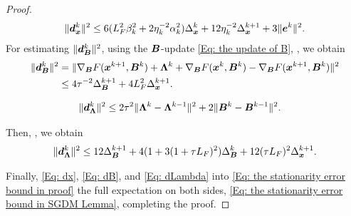 \begin{proof}
    \begin{align}
        \label{Eq: dx}\| \bd_{\bx}^{k}\|^{2}\leq 6( L^2_{F}\beta_{k}^{2}+ 2 \eta_{k}^{-2}\alpha_{k}^{2}) \Delta_{\bx}^{k}+ 12 \eta_{k}^{-2}\Delta_{\bx}^{k+1}+ 3 \| \be^{k}\|^{2}.
    \end{align}
    For estimating $\|\bm{d}^{k}_{\bm{B}}\|^{2}$, using the $\bm{B}$-update
    \eqref{Eq: the update of B}, , we obtain
    \begin{align}
        \|\bd_{\bB}^{k}\|^{2} & = \| \nabla_{\bB}F(\bx^{k+1}, \bB^{k})+ \bm{\Lambda}^{k}+ \nabla_{\bB}F(\bx^{k}, \bB^{k}) - \nabla_{\bB}F(\bx^{k+1}, \bB^{k}) \|^{2}\notag \\
                              & \leq4 \tau^{-2}\Delta^{k+1}_{\bB}+ 4L_{F}^{2}\Delta_{\bx}^{k+1}.\label{Eq: dB}
    \end{align}

\begin{align}
    \|\bm{d}^{k}_{\bm{\Lambda}}\|^{2} & \leq 2\tau^{2}\|\bm{\Lambda}^{k}- \bm{\Lambda}^{k-1}\|^{2}+ 2\|\bm{B}^{k}- \bm{B}^{k-1}\|^{2}. \notag
\end{align}

    Then, , we obtain
    \begin{align}
        \label{Eq: dLambda}\|\bd^{k}_{\bm{\Lambda}}\|^{2}\leq 12 \Delta_{\bB}^{k+1}+ 4(1 + 3 (1 + \tau L_{F})^{2})\Delta_{\bB}^{k}+ 12(\tau L_{F})^{2}\Delta_{\bx}^{k+1}.
    \end{align}

    Finally,  \eqref{Eq: dx}, \eqref{Eq: dB}, and \eqref{Eq: dLambda}
    into \eqref{Eq: the stationarity error bound in proof}  the full expectation
    on both sides,  \eqref{Eq: the stationarity error bound in SGDM Lemma},
    completing the proof. 
\end{proof}

